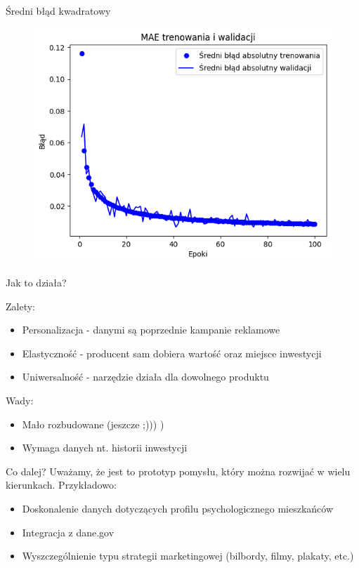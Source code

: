 \documentclass{beamer}
\begin{document}
\begin{frame}{Średni błąd kwadratowy}
\begin{figure}
    \centering
    \includegraphics[width=0.7\linewidth]{mae.png}
\end{figure}
\end{frame}


\begin{frame}[t]{Jak to działa?}

{\Large Zalety:}
\vspace{0.5cm}
\begin{itemize}
    \item Personalizacja - danymi są poprzednie kampanie reklamowe
    \item Elastyczność - producent sam dobiera wartość oraz miejsce inwestycji
    \item Uniwersalność - narzędzie działa dla dowolnego produktu
\end{itemize}

\pause

\vspace{1cm}

{\Large Wady:}
\vspace{0.5cm}
\begin{itemize}
    \item Mało rozbudowane (jeszcze ;))) )
    \item Wymaga danych nt. historii inwestycji
\end{itemize}

\end{frame}

\begin{frame}{Co dalej?}
Uważamy, że jest to prototyp pomysłu, który można rozwijać w wielu kierunkach. Przykładowo:
\begin{itemize}
    \item Doskonalenie danych dotyczących profilu psychologicznego mieszkańców
    \item Integracja z dane.gov
    \item Wyszczególnienie typu strategii marketingowej (bilbordy, filmy, plakaty, etc.)
\end{itemize}

\end{frame}
\end{document}
